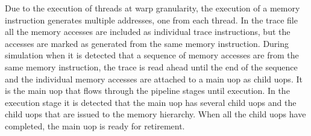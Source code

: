 Due to the execution of threads at warp granularity, the execution of a memory
instruction generates multiple addresses, one from each thread. In the trace
file all the memory accesses are included as individual trace instructions, but
the accesses are marked as generated from the same memory instruction. During
simulation when it is detected that a sequence of memory accesses are from the
same memory instruction, the trace is read ahead until the end of the sequence
and the individual memory accesses are attached to a main uop as child uops. It
is the main uop that flows through the pipeline stages until execution. In the
execution stage it is detected that the main uop has several child uops and the
child uops that are issued to the memory hierarchy. When all the child uops
have completed, the main uop is ready for retirement.




